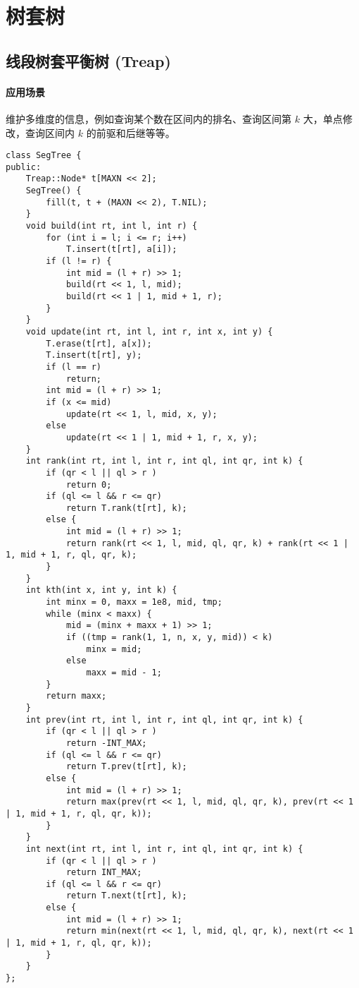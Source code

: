 \section{树套树}

\subsection{线段树套平衡树 (Treap)}

\paragraph{应用场景} 维护多维度的信息，例如查询某个数在区间内的排名、查询区间第 $k$ 大，单点修改，查询区间内 $k$ 的前驱和后继等等。

\begin{verbatim}
class SegTree {
public:
    Treap::Node* t[MAXN << 2];
    SegTree() {
        fill(t, t + (MAXN << 2), T.NIL);
    }
    void build(int rt, int l, int r) {
        for (int i = l; i <= r; i++)
            T.insert(t[rt], a[i]);
        if (l != r) {
            int mid = (l + r) >> 1;
            build(rt << 1, l, mid);
            build(rt << 1 | 1, mid + 1, r);
        }
    }
    void update(int rt, int l, int r, int x, int y) {
        T.erase(t[rt], a[x]);
        T.insert(t[rt], y);
        if (l == r)
            return;
        int mid = (l + r) >> 1;
        if (x <= mid)
            update(rt << 1, l, mid, x, y);
        else
            update(rt << 1 | 1, mid + 1, r, x, y);
    }
    int rank(int rt, int l, int r, int ql, int qr, int k) {
        if (qr < l || ql > r )
            return 0;
        if (ql <= l && r <= qr)
            return T.rank(t[rt], k);
        else {
            int mid = (l + r) >> 1;
            return rank(rt << 1, l, mid, ql, qr, k) + rank(rt << 1 | 1, mid + 1, r, ql, qr, k);
        }
    }
    int kth(int x, int y, int k) {
        int minx = 0, maxx = 1e8, mid, tmp;
        while (minx < maxx) {
            mid = (minx + maxx + 1) >> 1;
            if ((tmp = rank(1, 1, n, x, y, mid)) < k)
                minx = mid;
            else 
                maxx = mid - 1;
        }
        return maxx;
    }
    int prev(int rt, int l, int r, int ql, int qr, int k) {
        if (qr < l || ql > r )
            return -INT_MAX;
        if (ql <= l && r <= qr)
            return T.prev(t[rt], k);
        else {
            int mid = (l + r) >> 1;
            return max(prev(rt << 1, l, mid, ql, qr, k), prev(rt << 1 | 1, mid + 1, r, ql, qr, k));
        }
    }
    int next(int rt, int l, int r, int ql, int qr, int k) {
        if (qr < l || ql > r )
            return INT_MAX;
        if (ql <= l && r <= qr)
            return T.next(t[rt], k);
        else {
            int mid = (l + r) >> 1;
            return min(next(rt << 1, l, mid, ql, qr, k), next(rt << 1 | 1, mid + 1, r, ql, qr, k));
        }
    }    
};
\end{verbatim}


